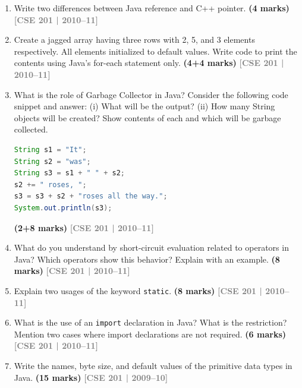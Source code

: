 \documentclass[12pt,a3paper]{article}
\newcommand{\yr}[1]{\hfill\textcolor{gray}{\small\textbf{[#1]}}}
\newcommand{\mk}[1]{\textcolor{orange!70!black}{\small\textbf{(#1 marks)}}}
\begin{document}
\begin{enumerate}



\item Write two differences between Java reference and C++ pointer. \mk{4}
\yr{CSE 201 | 2010--11}




\item Create a jagged array having three rows with 2, 5, and 3 elements respectively. All elements initialized to default values. Write code to print the contents using Java's for-each statement only. \mk{4+4}
\yr{CSE 201 | 2010--11}




\item What is the role of Garbage Collector in Java? Consider the following code snippet and answer: (i) What will be the output? (ii) How many String objects will be created? Show contents of each and which will be garbage collected.
\begin{lstlisting}[language=Java]
String s1 = "It";
String s2 = "was";
String s3 = s1 + " " + s2;
s2 += " roses, ";
s3 = s3 + s2 + "roses all the way.";
System.out.println(s3);
\end{lstlisting}
\mk{2+8}
\yr{CSE 201 | 2010--11}




\item What do you understand by short-circuit evaluation related to operators in Java? Which operators show this behavior? Explain with an example. \mk{8}
\yr{CSE 201 | 2010--11}




\item Explain two usages of the keyword \texttt{static}. \mk{8}
\yr{CSE 201 | 2010--11}

\item What is the use of an \texttt{import} declaration in Java? What is the restriction? Mention two cases where import declarations are not required. \mk{6}
\yr{CSE 201 | 2010--11}

\item Write the names, byte size, and default values of the primitive data types in Java. \mk{15}
\yr{CSE 201 | 2009--10}


\end{enumerate}
\end{document}
